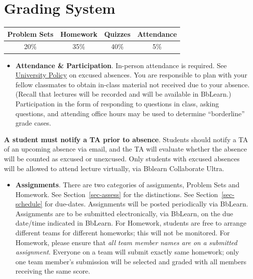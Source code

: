 \documentclass[
  letterpaper,
  DIV=11,
  numbers=noendperiod]{scrreprt}
\providecommand{\tightlist}{%
  \setlength{\itemsep}{0pt}\setlength{\parskip}{0pt}}\usepackage{longtable,booktabs,array}
\begin{document}
\hypertarget{grading-system}{%
\section{Grading System}\label{grading-system}}

\begin{longtable}[]{@{}cccc@{}}
\toprule()
Problem Sets & Homework & Quizzes & Attendance \\
\midrule()
\endhead
20\% & 35\% & 40\% & 5\% \\
\bottomrule()
\end{longtable}

\begin{itemize}
\tightlist
\item
  \textbf{Attendance \& Participation}. In-person attendance is
  required. See
  \href{https://nau.edu/university-policy-library/student-institutional-excuses/}{University
  Policy} on excused absences. You are responsible to plan with your
  fellow classmates to obtain in-class material not received due to your
  absence. (Recall that lectures will be recorded and will be available
  in BbLearn.) Participation in the form of responding to questions in
  class, asking questions, and attending office hours may be used to
  determine ``borderline'' grade cases.
\end{itemize}

\begin{tcolorbox}[enhanced jigsaw, colback=white, title=\textcolor{quarto-callout-important-color}{\faExclamation}\hspace{0.5em}{Prior notification of absence}, left=2mm, coltitle=black, bottomrule=.15mm, arc=.35mm, toprule=.15mm, rightrule=.15mm, opacityback=0, opacitybacktitle=0.6, colframe=quarto-callout-important-color-frame, leftrule=.75mm, toptitle=1mm, titlerule=0mm, breakable, bottomtitle=1mm, colbacktitle=quarto-callout-important-color!10!white]

\textbf{A student must notify a TA prior to absence}. Students should
notify a TA of an upcoming absence via email, and the TA will evaluate
whether the absence will be counted as excused or unexcused. Only
students with excused absences will be allowed to attend lecture
virtually, via Bblearn Collaborate Ultra.

\end{tcolorbox}

\begin{itemize}
\tightlist
\item
  \textbf{Assignments}. There are two categories of assignments, Problem
  Sets and Homework. See Section~\ref{sec-assess} for the distinctions.
  See Section~\ref{sec-schedule} for due-dates. Assignments will be
  posted periodically via BbLearn. Assignments are to be submitted
  electronically, via BbLearn, on the due date/time indicated in
  BbLearn. For Homework, students are free to arrange different teams
  for different homeworks; this will not be monitored. For Homework,
  please ensure that \emph{all team member names are on a submitted
  assignment}. Everyone on a team will submit exactly same homework;
  only one team member's submission will be selected and graded with all
  members receiving the same score.
\end{itemize}
\end{document}

